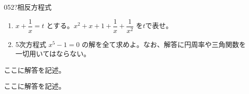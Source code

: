 \begin{prob}{052}{\hosi ?}{相反方程式}
 \begin{enumerate}
  \item $x+\dfrac{1}{x}=t$ とする。$x^2+x+1+\dfrac{1}{x}+\dfrac{1}{x^2}$ を$t$で表せ。
  \item 5次方程式 $x^5-1=0$ の解を全て求めよ。なお、解答に円周率や三角関数を一切用いてはならない。
 \end{enumerate}
\end{prob}
ここに解答を記述。

ここに解答を記述。